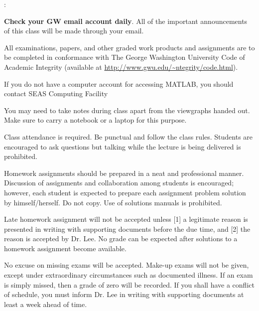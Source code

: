 \documentclass[10pt]{article}
\begin{document}
\begin{list}
{:}
{\setlength{\itemsep}{-3pt}}

\item \textbf{Check your GW email account daily}. All of the important announcements of this class will be made through your email. 



\item All examinations, papers, and other graded work products and assignments are to be completed in conformance with The George Washington University Code of Academic Integrity (available at \url{http://www.gwu.edu/~ntegrity/code.html}).

\item If you do not have a computer account for accessing MATLAB, you should contact SEAS Computing Facility

\item You may need to take notes during class apart from the viewgraphs handed out. Make sure to carry a notebook or a laptop for this purpose.

\item Class attendance is required. Be punctual and follow the class rules. Students are encouraged to ask questions but talking while the lecture is being delivered is prohibited.

\item Homework assignments should be prepared in a neat and professional manner. Discussion of assignments and collaboration among students is  encouraged; however,  each student is expected to prepare each assignment problem solution by himself/herself. Do not copy. Use of solutions manuals is prohibited.

\item Late homework assignment will not be accepted unless [1] a legitimate reason is presented in writing with supporting documents before the due time, and [2] the reason is accepted by Dr. Lee. No grade can be expected after solutions to a homework assignment become available.

\item No excuse on missing exams will be accepted. Make-up exams will not be given, except under extraordinary circumstances such as documented illness. If an exam is simply missed, then a grade of zero will be recorded. If you shall have a conflict of schedule, you must inform Dr. Lee in writing with supporting documents at least a week ahead of time.


\end{list}
\end{document}
